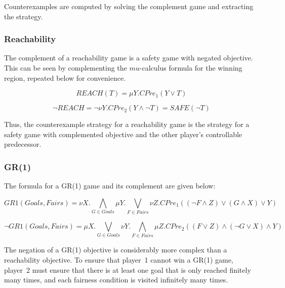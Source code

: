 Counterexamples are computed by solving the complement game and extracting the strategy.

\subsubsection{Reachability}

The complement of a reachability game is a safety game with negated objective. This can be seen by complementing the $mu$-calculus formula for the winning region, repeated below for convenience.

\begin{equation}
    \mathit{REACH}(T) = \mu Y. CPre_1(Y \vee T)
\end{equation}

\begin{equation}
    \neg\mathit{REACH} = \neg\nu Y. CPre_2(Y \wedge \neg T) = \mathit{SAFE}(\neg T) 
\end{equation}

Thus, the counterexample strategy for a reachability game is the strategy for a safety game with complemented objective and the other player's controllable predecessor. 

\subsubsection{GR(1)}

The formula for a GR(1) game and its complement are given below:

\begin{equation}
    GR1(Goals, Fairs) = \nu X. \bigwedge_{G \in Goals} \mu Y. \bigvee_{F \in Fairs} \nu Z. CPre_1((\neg F \wedge Z) \vee (G \wedge X) \vee Y)
\end{equation}

\begin{equation}
    \neg GR1(Goals, Fairs) = \mu X. \bigvee_{G \in Goals} \nu Y. \bigwedge_{F \in Fairs} \mu Z. CPre_2((F \vee Z) \wedge (\neg G \vee X) \wedge Y)
\end{equation}

The negation of a GR(1) objective is considerably more complex than a reachability objective. To ensure that player~1 cannot win a GR(1) game, player~2 must ensure that there is at least one goal that is only reached finitely many times, and each fairness condition is visited infinitely many times. 

